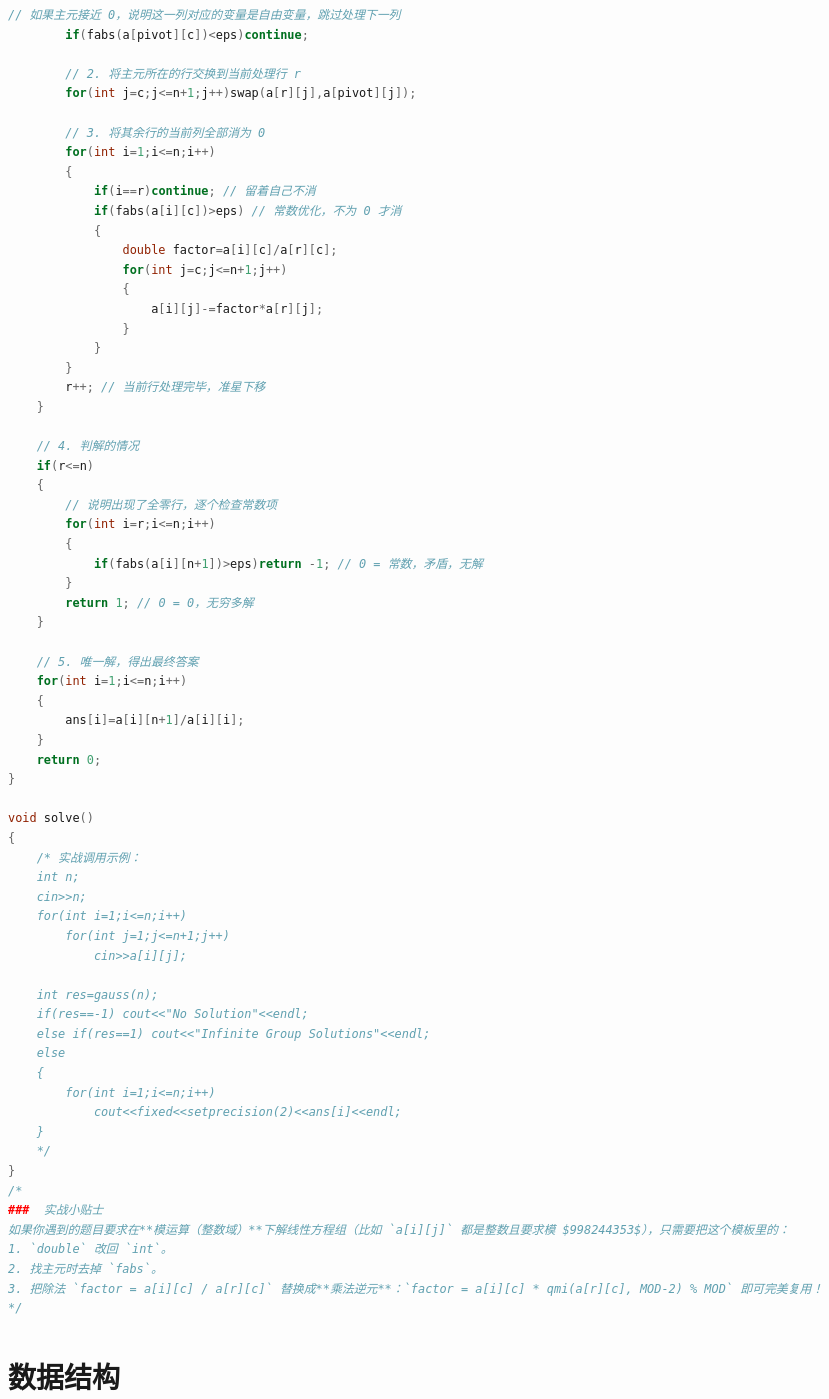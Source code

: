 \documentclass[10pt,landscape,a4paper]{article}
\begin{document}
\begin{multicols*}{3}
\begin{lstlisting}[language=C++]
        // 如果主元接近 0，说明这一列对应的变量是自由变量，跳过处理下一列
        if(fabs(a[pivot][c])<eps)continue;
        
        // 2. 将主元所在的行交换到当前处理行 r
        for(int j=c;j<=n+1;j++)swap(a[r][j],a[pivot][j]);
        
        // 3. 将其余行的当前列全部消为 0
        for(int i=1;i<=n;i++)
        {
            if(i==r)continue; // 留着自己不消
            if(fabs(a[i][c])>eps) // 常数优化，不为 0 才消
            {
                double factor=a[i][c]/a[r][c];
                for(int j=c;j<=n+1;j++)
                {
                    a[i][j]-=factor*a[r][j];
                }
            }
        }
        r++; // 当前行处理完毕，准星下移
    }
    
    // 4. 判解的情况
    if(r<=n)
    {
        // 说明出现了全零行，逐个检查常数项
        for(int i=r;i<=n;i++)
        {
            if(fabs(a[i][n+1])>eps)return -1; // 0 = 常数，矛盾，无解
        }
        return 1; // 0 = 0，无穷多解
    }
    
    // 5. 唯一解，得出最终答案
    for(int i=1;i<=n;i++)
    {
        ans[i]=a[i][n+1]/a[i][i];
    }
    return 0;
}

void solve()
{
    /* 实战调用示例：
    int n;
    cin>>n;
    for(int i=1;i<=n;i++)
        for(int j=1;j<=n+1;j++)
            cin>>a[i][j];
            
    int res=gauss(n);
    if(res==-1) cout<<"No Solution"<<endl;
    else if(res==1) cout<<"Infinite Group Solutions"<<endl;
    else 
    {
        for(int i=1;i<=n;i++)
            cout<<fixed<<setprecision(2)<<ans[i]<<endl;
    }
    */
}
/*
###  实战小贴士
如果你遇到的题目要求在**模运算（整数域）**下解线性方程组（比如 `a[i][j]` 都是整数且要求模 $998244353$），只需要把这个模板里的：
1. `double` 改回 `int`。
2. 找主元时去掉 `fabs`。
3. 把除法 `factor = a[i][c] / a[r][c]` 替换成**乘法逆元**：`factor = a[i][c] * qmi(a[r][c], MOD-2) % MOD` 即可完美复用！
*/
\end{lstlisting}
\section*{数据结构}

\end{multicols*}
\end{document}
